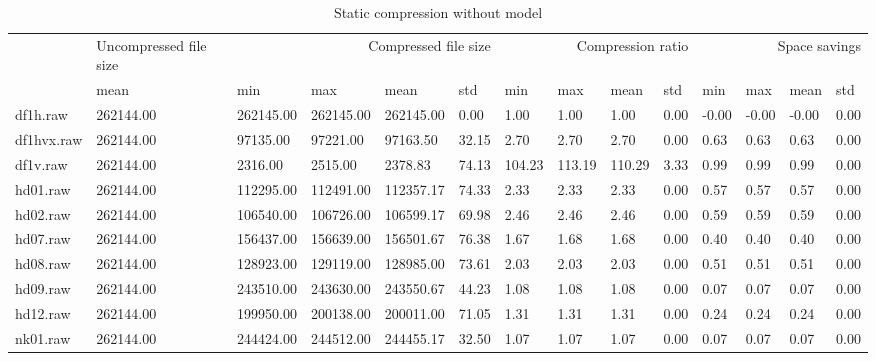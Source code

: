 \begin{table}
\caption{Static compression without model}
\begin{tabular}{llllllllllllll}
 & Uncompressed file size & \multicolumn{4}{r}{Compressed file size} & \multicolumn{4}{r}{Compression ratio} & \multicolumn{4}{r}{Space savings} \\
 & mean & min & max & mean & std & min & max & mean & std & min & max & mean & std \\
df1h.raw & 262144.00 & 262145.00 & 262145.00 & 262145.00 & 0.00 & 1.00 & 1.00 & 1.00 & 0.00 & -0.00 & -0.00 & -0.00 & 0.00 \\
df1hvx.raw & 262144.00 & 97135.00 & 97221.00 & 97163.50 & 32.15 & 2.70 & 2.70 & 2.70 & 0.00 & 0.63 & 0.63 & 0.63 & 0.00 \\
df1v.raw & 262144.00 & 2316.00 & 2515.00 & 2378.83 & 74.13 & 104.23 & 113.19 & 110.29 & 3.33 & 0.99 & 0.99 & 0.99 & 0.00 \\
hd01.raw & 262144.00 & 112295.00 & 112491.00 & 112357.17 & 74.33 & 2.33 & 2.33 & 2.33 & 0.00 & 0.57 & 0.57 & 0.57 & 0.00 \\
hd02.raw & 262144.00 & 106540.00 & 106726.00 & 106599.17 & 69.98 & 2.46 & 2.46 & 2.46 & 0.00 & 0.59 & 0.59 & 0.59 & 0.00 \\
hd07.raw & 262144.00 & 156437.00 & 156639.00 & 156501.67 & 76.38 & 1.67 & 1.68 & 1.68 & 0.00 & 0.40 & 0.40 & 0.40 & 0.00 \\
hd08.raw & 262144.00 & 128923.00 & 129119.00 & 128985.00 & 73.61 & 2.03 & 2.03 & 2.03 & 0.00 & 0.51 & 0.51 & 0.51 & 0.00 \\
hd09.raw & 262144.00 & 243510.00 & 243630.00 & 243550.67 & 44.23 & 1.08 & 1.08 & 1.08 & 0.00 & 0.07 & 0.07 & 0.07 & 0.00 \\
hd12.raw & 262144.00 & 199950.00 & 200138.00 & 200011.00 & 71.05 & 1.31 & 1.31 & 1.31 & 0.00 & 0.24 & 0.24 & 0.24 & 0.00 \\
nk01.raw & 262144.00 & 244424.00 & 244512.00 & 244455.17 & 32.50 & 1.07 & 1.07 & 1.07 & 0.00 & 0.07 & 0.07 & 0.07 & 0.00 \\
\end{tabular}
\end{table}

